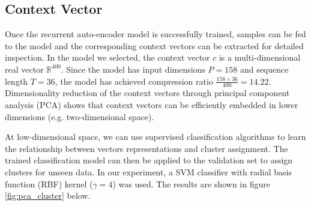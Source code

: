 \documentclass[runningheads]{llncs}
\begin{document}
\subsection{Context Vector}



Once the recurrent auto-encoder model is successfully trained, samples can be fed to the model and the corresponding context vectors can be extracted for detailed inspection. In the model we selected, the context vector \(c\) is a multi-dimensional real vector \(\mathbb{R}^{400}\). Since the model has input dimensions \(P=158\)  and sequence length \(T=36\), the model has achieved compression ratio \(\frac{158\times36}{400}=14.22\). Dimensionality reduction of the context vectors through principal component analysis (PCA) shows that context vectors can be efficiently embedded in lower dimensions (e.g. two-dimensional space).

At low-dimensional space, we can use supervised classification algorithms to learn the relationship between vectors representations and cluster assignment. The trained classification model can then be applied to the validation set to assign clusters for unseen data. In our experiment, a SVM classifier with radial basis function (RBF) kernel (\(\gamma=4\)) was used. The results are shown in figure \ref{fig:pca_cluster} below.
\end{document}
